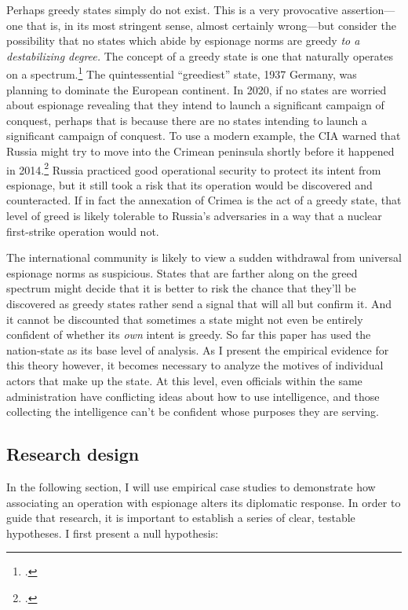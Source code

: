 \documentclass[12pt]{extarticle}
\begin{document}
Perhaps greedy states simply do not exist. This is a very provocative assertion---one that is, in its most stringent sense, almost certainly wrong---but consider the possibility that no states which abide by espionage norms are greedy \emph{to a destabilizing degree.} The concept of a greedy state is one that naturally operates on a spectrum.\footcite[39. Throughout his book, Glaser simplifies and complicates his theory as is necessary for the particular analysis he is performing. Greedy states can be understood as the opposite of security-seeking states, or it can be its own independant variable, allowing for the possibility of states that are greedy \emph{and} security-seeking, or just one of the two.]{glaser_rational_2010} The quintessential \enquote{greediest} state, 1937 Germany, was planning to dominate the European continent. In 2020, if no states are worried about espionage revealing that they intend to launch a significant campaign of conquest, perhaps that is because there are no states intending to launch a significant campaign of conquest. To use a modern example, the CIA warned that Russia might try to move into the Crimean peninsula shortly before it happened in 2014.\footcite{hosenball_ukraine_2014} Russia practiced good operational security to protect its intent from espionage, but it still took a risk that its operation would be discovered and counteracted. If in fact the annexation of Crimea is the act of a greedy state, that level of greed is likely tolerable to Russia's adversaries in a way that a nuclear first-strike operation would not.

The international community is likely to view a sudden withdrawal from universal espionage norms as suspicious. States that are farther along on the greed spectrum might decide that it is better to risk the chance that they'll be discovered as greedy states rather send a signal that will all but confirm it. And it cannot be discounted that sometimes a state might not even be entirely confident of whether its \emph{own} intent is greedy. So far this paper has used the nation-state as its base level of analysis. As I present the empirical evidence for this theory however, it becomes necessary to analyze the motives of individual actors that make up the state. At this level, even officials within the same administration have conflicting ideas about how to use intelligence, and those collecting the intelligence can't be confident whose purposes they are serving.

\subsection{Research design}
In the following section, I will use empirical case studies to demonstrate how associating an operation with espionage alters its diplomatic response. In order to guide that research, it is important to establish a series of clear, testable hypotheses. I first present a null hypothesis:
\end{document}
